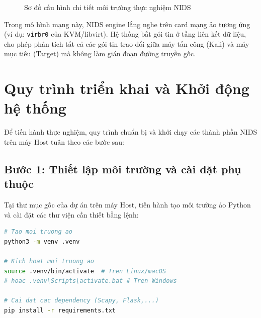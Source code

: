 \begin{figure}[h!]
    \centering
    \caption{Sơ đồ cấu hình chi tiết môi trường thực nghiệm NIDS}
    \label{fig:test_environment_detail}
\end{figure}

Trong mô hình mạng này, NIDS engine lắng nghe trên card mạng ảo tương ứng (ví dụ: \texttt{virbr0} của KVM/libvirt). Hệ thống bắt gói tin ở tầng liên kết dữ liệu, cho phép phân tích tất cả các gói tin trao đổi giữa máy tấn công (Kali) và máy mục tiêu (Target) mà không làm gián đoạn đường truyền gốc.

\section{Quy trình triển khai và Khởi động hệ thống}
Để tiến hành thực nghiệm, quy trình chuẩn bị và khởi chạy các thành phần NIDS trên máy Host tuân theo các bước sau:

\subsection{Bước 1: Thiết lập môi trường và cài đặt phụ thuộc}
Tại thư mục gốc của dự án trên máy Host, tiến hành tạo môi trường ảo Python và cài đặt các thư viện cần thiết bằng lệnh:
\begin{lstlisting}[language=bash, caption={Cài đặt môi trường ảo và thư viện}]
# Tao moi truong ao
python3 -m venv .venv

# Kich hoat moi truong ao
source .venv/bin/activate  # Tren Linux/macOS
# hoac .venv\Scripts\activate.bat # Tren Windows

# Cai dat cac dependency (Scapy, Flask,...)
pip install -r requirements.txt
\end{lstlisting}


